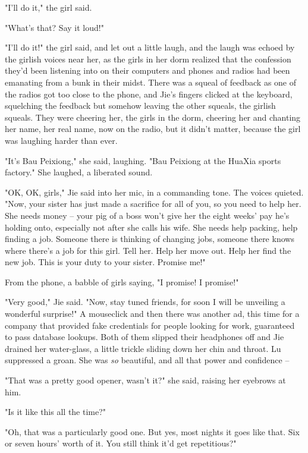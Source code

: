 "I'll do it," the girl said.

"What's that? Say it loud!"

"I'll do it!" the girl said, and let out a little laugh, and the
laugh was echoed by the girlish voices near her, as the girls in
her dorm realized that the confession they'd been listening into on
their computers and phones and radios had been emanating from a
bunk in their midst. There was a squeal of feedback as one of the
radios got too close to the phone, and Jie's fingers clicked at the
keyboard, squelching the feedback but somehow leaving the other
squeals, the girlish squeals. They were cheering her, the girls in
the dorm, cheering her and chanting her name, her real name, now on
the radio, but it didn't matter, because the girl was laughing
harder than ever.

"It's Bau Peixiong," she said, laughing. "Bau Peixiong at the
HuaXia sports factory." She laughed, a liberated sound.

"OK, OK, girls," Jie said into her mic, in a commanding tone. The
voices quieted. "Now, your sister has just made a sacrifice for all
of you, so you need to help her. She needs money -- your pig of a
boss won't give her the eight weeks' pay he's holding onto,
especially not after she calls his wife. She needs help packing,
help finding a job. Someone there is thinking of changing jobs,
someone there knows where there's a job for this girl. Tell her.
Help her move out. Help her find the new job. This is your duty to
your sister. Promise me!"

From the phone, a babble of girls saying, "I promise! I promise!"

"Very good," Jie said. "Now, stay tuned friends, for soon I will be
unveiling a wonderful surprise!" A mouseclick and then there was
another ad, this time for a company that provided fake credentials
for people looking for work, guaranteed to pass database lookups.
Both of them slipped their headphones off and Jie drained her
water-glass, a little trickle sliding down her chin and throat. Lu
suppressed a groan. She was \emph{so} beautiful, and all that power
and confidence --

"That was a pretty good opener, wasn't it?" she said, raising her
eyebrows at him.

"Is it like this all the time?"

"Oh, that was a particularly good one. But yes, most nights it goes
like that. Six or seven hours' worth of it. You still think it'd
get repetitious?"

